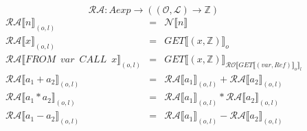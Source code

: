 \documentclass[12pt]{article}
\newcommand{\RA}{\mathcal{RA}}
\newcommand{\RO}{\mathcal{RO}}
\begin{document}
\[ \RA : Aexp \rightarrow ((\mathcal{O}, \mathcal{L}) \rightarrow \mathds{Z} ) \]
\[
\begin{matrix}
\RA\llbracket n \rrbracket_{(o,l)} & = & \mathcal{N}\llbracket n \rrbracket\\
\RA\llbracket x \rrbracket_{(o,l)} & = & GET\llbracket (x,\mathds{Z}) \rrbracket_{o}\\
\RA\llbracket FROM \enspace var \enspace CALL \enspace x \rrbracket_{(o,l)} & = & GET\llbracket (x,\mathds{Z}) \rrbracket_{\RO \llbracket GET\llbracket (var,Ref) \rrbracket_o \rrbracket_l }\\
\RA\llbracket a_1 + a_2 \rrbracket_{(o,l)} & = & \RA\llbracket a_1 \rrbracket_{(o,l)} + \RA\llbracket a_2 \rrbracket_{(o,l)}\\
\RA\llbracket a_1 * a_2 \rrbracket_{(o,l)} & = & \RA\llbracket a_1 \rrbracket_{(o,l)} * \RA\llbracket a_2 \rrbracket_{(o,l)}\\
\RA\llbracket a_1 - a_2 \rrbracket_{(o,l)}& = & \RA\llbracket a_1 \rrbracket_{(o,l)} - \RA\llbracket a_2 \rrbracket_{(o,l)}\\
\end{matrix}
\]
\end{document}
